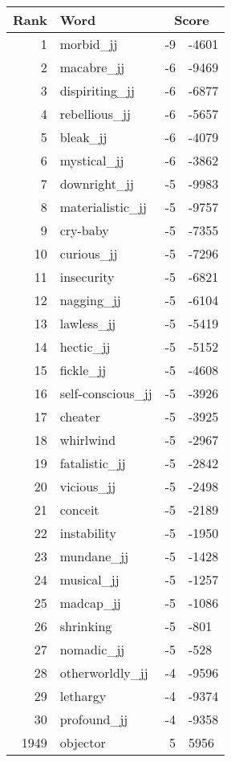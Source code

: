 \begin{longtable}[!htbp]{| rlr@{.}l |}
    \hline
    \textbf{Rank} & \textbf{Word} & \multicolumn{2}{c|}{\textbf{Score}} \\
    \hline
    \endhead
    1 & morbid\_jj & -9 & -4601 \\
    2 & macabre\_jj & -6 & -9469 \\
    3 & dispiriting\_jj & -6 & -6877 \\
    4 & rebellious\_jj & -6 & -5657 \\
    5 & bleak\_jj & -6 & -4079 \\
    6 & mystical\_jj & -6 & -3862 \\
    7 & downright\_jj & -5 & -9983 \\
    8 & materialistic\_jj & -5 & -9757 \\
    9 & cry-baby & -5 & -7355 \\
    10 & curious\_jj & -5 & -7296 \\
    11 & insecurity & -5 & -6821 \\
    12 & nagging\_jj & -5 & -6104 \\
    13 & lawless\_jj & -5 & -5419 \\
    14 & hectic\_jj & -5 & -5152 \\
    15 & fickle\_jj & -5 & -4608 \\
    16 & self-conscious\_jj & -5 & -3926 \\
    17 & cheater & -5 & -3925 \\
    18 & whirlwind & -5 & -2967 \\
    19 & fatalistic\_jj & -5 & -2842 \\
    20 & vicious\_jj & -5 & -2498 \\
    21 & conceit & -5 & -2189 \\
    22 & instability & -5 & -1950 \\
    23 & mundane\_jj & -5 & -1428 \\
    24 & musical\_jj & -5 & -1257 \\
    25 & madcap\_jj & -5 & -1086 \\
    26 & shrinking & -5 & -801 \\
    27 & nomadic\_jj & -5 & -528 \\
    28 & otherworldly\_jj & -4 & -9596 \\
    29 & lethargy & -4 & -9374 \\
    30 & profound\_jj & -4 & -9358 \\
    1949 & objector & 5 & 5956 \\

\end{longtable}
